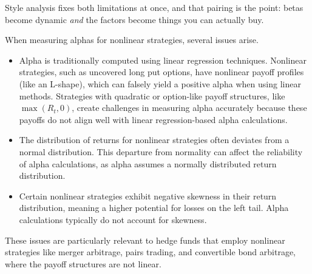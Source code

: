\begin{imkeybox}
Style analysis fixes both limitations at once, and that pairing is the point:
betas become dynamic \emph{and} the factors become things you can actually buy.
\end{imkeybox}


When measuring alphas for nonlinear strategies, several issues arise.

\begin{itemize}
\item {} Alpha is traditionally
computed using linear regression techniques. Nonlinear strategies, such as
uncovered long put options, have nonlinear payoff profiles (like an L-shape),
which can falsely yield a positive alpha when using linear methods. Strategies
with quadratic or option-like payoff structures, like $\max(R_t, 0)$, create
challenges in measuring alpha accurately because these payoffs do not align well
with linear regression-based alpha calculations.
\item {} The distribution of returns for nonlinear
strategies often deviates from a normal distribution. This departure from
normality can affect the reliability of alpha calculations, as alpha assumes a
normally distributed return distribution.
\item {} Certain nonlinear strategies exhibit negative
skewness in their return distribution, meaning a higher potential for losses on
the left tail. Alpha calculations typically do not account for skewness.
\end{itemize}

These issues are particularly relevant to hedge funds that employ nonlinear
strategies like merger arbitrage, pairs trading, and convertible bond arbitrage,
where the payoff structures are not linear.


